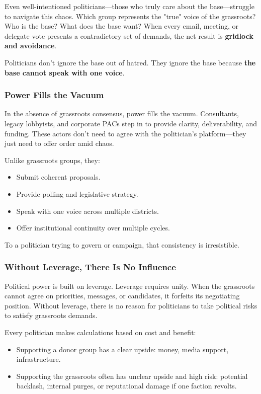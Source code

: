 Even well-intentioned politicians—those who truly care about the base—struggle to navigate this chaos. Which group represents the "true" voice of the grassroots? Who is the base? What does the base want? When every email, meeting, or delegate vote presents a contradictory set of demands, the net result is \textbf{gridlock and avoidance}.

Politicians don’t ignore the base out of hatred. They ignore the base because \textbf{the base cannot speak with one voice}.

\subsubsection{Power Fills the Vacuum}
In the absence of grassroots consensus, power fills the vacuum. Consultants, legacy lobbyists, and corporate PACs step in to provide clarity, deliverability, and funding. These actors don’t need to agree with the politician’s platform—they just need to offer order amid chaos.

Unlike grassroots groups, they:
\begin{itemize}
\item Submit coherent proposals.
\item Provide polling and legislative strategy.
\item Speak with one voice across multiple districts.
\item Offer institutional continuity over multiple cycles.
\end{itemize}

To a politician trying to govern or campaign, that consistency is irresistible.

\subsubsection{Without Leverage, There Is No Influence}
Political power is built on leverage. Leverage requires unity. When the grassroots cannot agree on priorities, messages, or candidates, it forfeits its negotiating position. Without leverage, there is no reason for politicians to take political risks to satisfy grassroots demands.

Every politician makes calculations based on cost and benefit:
\begin{itemize}
\item Supporting a donor group has a clear upside: money, media support, infrastructure.
\item Supporting the grassroots often has unclear upside and high risk: potential backlash, internal purges, or reputational damage if one faction revolts.
\end{itemize}

